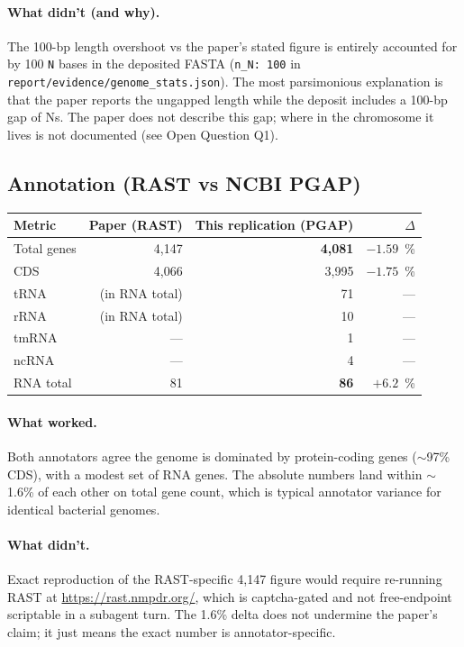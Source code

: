 \documentclass[11pt]{article}
\begin{document}
\paragraph{What didn't (and why).} The 100-bp length overshoot vs the paper's stated
figure is entirely accounted for by 100 \verb|N| bases in the deposited FASTA
(\texttt{n\_N: 100} in \texttt{report/evidence/genome\_stats.json}). The most parsimonious
explanation is that the paper reports the ungapped length while the deposit includes a
100-bp gap of Ns. The paper does not describe this gap; where in the chromosome it lives
is not documented (see Open Question Q1).

\subsection{Annotation (RAST vs NCBI PGAP)}
\begin{tabular}{lrrr}
\toprule
Metric & Paper (RAST) & This replication (PGAP) & $\Delta$\\
\midrule
Total genes & 4{,}147 & \textbf{4{,}081} & $-1.59$~\%\\
CDS         & 4{,}066 & 3{,}995          & $-1.75$~\%\\
tRNA        & (in RNA total) & 71 & --- \\
rRNA        & (in RNA total) & 10 & --- \\
tmRNA       & ---            & 1  & --- \\
ncRNA       & ---            & 4  & --- \\
RNA total   & 81  & \textbf{86}  & $+6.2$~\%\\
\bottomrule
\end{tabular}

\paragraph{What worked.} Both annotators agree the genome is dominated by protein-coding
genes ($\sim$97\% CDS), with a modest set of RNA genes. The absolute numbers land within
$\sim$1.6\% of each other on total gene count, which is typical annotator variance for
identical bacterial genomes.

\paragraph{What didn't.} Exact reproduction of the RAST-specific 4{,}147 figure would
require re-running RAST at \url{https://rast.nmpdr.org/}, which is captcha-gated and not
free-endpoint scriptable in a subagent turn. The 1.6\% delta does not undermine the
paper's claim; it just means the exact number is annotator-specific.
\end{document}

